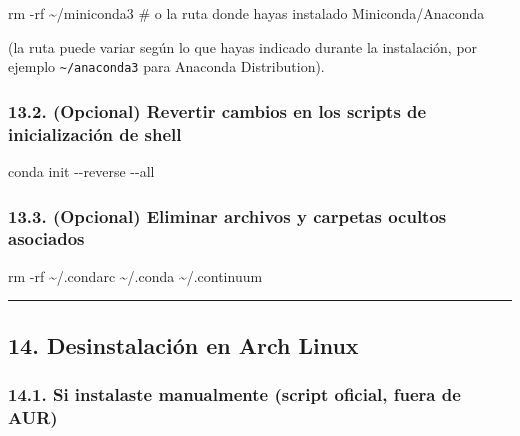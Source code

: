 \documentclass[
  doc,
  floatsintext,
  longtable,
  a4paper,
  nolmodern,
  notxfonts,
  notimes,
  12pt,
  colorlinks=true,linkcolor=blue,citecolor=blue,urlcolor=blue]{apa7}
\newenvironment{Shaded}{\begin{snugshade}}{\end{snugshade}}
\newcommand{\AttributeTok}[1]{\textcolor[rgb]{0.40,0.45,0.13}{#1}}
\newcommand{\CommentTok}[1]{\textcolor[rgb]{0.37,0.37,0.37}{#1}}
\newcommand{\ExtensionTok}[1]{\textcolor[rgb]{0.00,0.23,0.31}{#1}}
\newcommand{\FunctionTok}[1]{\textcolor[rgb]{0.28,0.35,0.67}{#1}}
\newcommand{\NormalTok}[1]{\textcolor[rgb]{0.00,0.23,0.31}{#1}}
\begin{document}
\begin{Shaded}
\begin{Highlighting}[]
\FunctionTok{rm} \AttributeTok{{-}rf}\NormalTok{ \textasciitilde{}/miniconda3   }\CommentTok{\# o la ruta donde hayas instalado Miniconda/Anaconda}
\end{Highlighting}
\end{Shaded}

(la ruta puede variar según lo que hayas indicado durante la
instalación, por ejemplo \texttt{\textasciitilde{}/anaconda3} para
Anaconda Distribution).

\subsubsection{13.2. (Opcional) Revertir cambios en los scripts de
inicialización de
shell}\label{opcional-revertir-cambios-en-los-scripts-de-inicializaciuxf3n-de-shell}

\begin{Shaded}
\begin{Highlighting}[]
\ExtensionTok{conda}\NormalTok{ init }\AttributeTok{{-}{-}reverse} \AttributeTok{{-}{-}all}
\end{Highlighting}
\end{Shaded}

\subsubsection{13.3. (Opcional) Eliminar archivos y carpetas ocultos
asociados}\label{opcional-eliminar-archivos-y-carpetas-ocultos-asociados}

\begin{Shaded}
\begin{Highlighting}[]
\FunctionTok{rm} \AttributeTok{{-}rf}\NormalTok{ \textasciitilde{}/.condarc \textasciitilde{}/.conda \textasciitilde{}/.continuum}
\end{Highlighting}
\end{Shaded}

\begin{center}\rule{0.5\linewidth}{0.5pt}\end{center}

\subsection{14. Desinstalación en Arch
Linux}\label{desinstalaciuxf3n-en-arch-linux}

\subsubsection{14.1. Si instalaste manualmente (script oficial, fuera de
AUR)}\label{si-instalaste-manualmente-script-oficial-fuera-de-aur}
\end{document}
